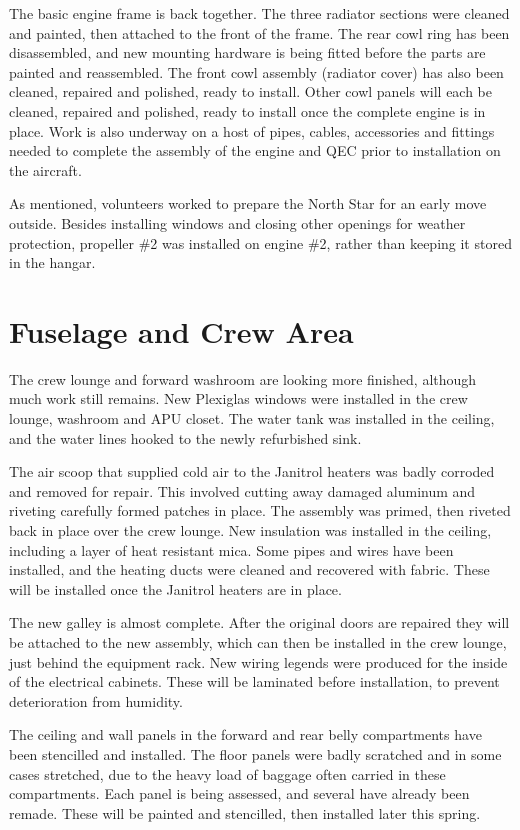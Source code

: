 The basic engine frame is back together.  The three radiator sections
were cleaned and painted, then attached to the front of the frame.
The rear cowl ring has been disassembled, and new mounting hardware is
being fitted before the parts are painted and reassembled.  The front
cowl assembly (radiator cover) has also been cleaned, repaired and
polished, ready to install.  Other cowl panels will each be cleaned,
repaired and polished, ready to install once the complete engine is in
place.  Work is also underway on a host of pipes, cables, accessories
and fittings needed to complete the assembly of the engine and QEC
prior to installation on the aircraft.

As mentioned, volunteers worked to prepare the North Star for an early
move outside.  Besides installing windows and closing other openings
for weather protection, propeller \#2 was installed on engine \#2,
rather than keeping it stored in the hangar.

\section{Fuselage and Crew Area}
\label{empennage}

The crew lounge and forward washroom are looking more finished,
although much work still remains.  New Plexiglas windows were
installed in the crew lounge, washroom and APU closet.  The water tank
was installed in the ceiling, and the water lines hooked to the newly
refurbished sink. 
 
The air scoop that supplied cold air to the Janitrol heaters was badly
corroded and removed for repair.  This involved cutting away damaged
aluminum and riveting carefully formed patches in place.  The assembly
was primed, then riveted back in place over the crew lounge.  New
insulation was installed in the ceiling, including a layer of heat
resistant mica.  Some pipes and wires have been installed, and the
heating ducts were cleaned and recovered with fabric.  These will be
installed once the Janitrol heaters are in place.

The new galley is almost complete.  After the original doors are
repaired they will be attached to the new assembly, which can then be
installed in the crew lounge, just behind the equipment rack.  New
wiring legends were produced for the inside of the electrical
cabinets.  These will be laminated before installation, to prevent
deterioration from humidity.

The ceiling and wall panels in the forward and rear belly compartments
have been stencilled and installed.  The floor panels were badly
scratched and in some cases stretched, due to the heavy load of
baggage often carried in these compartments.  Each panel is being
assessed, and several have already been remade.  These will be painted
and stencilled, then installed later this spring.

